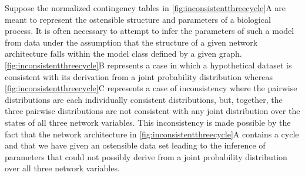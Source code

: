 Suppose the normalized contingency tables in \autoref{fig:inconsistentthreecycle}A are meant to represent the ostensible structure and parameters of a biological process. It is often necessary to attempt to infer the parameters of such a model from data under the assumption that the structure of a given network architecture falls within the model class defined by a given graph. \autoref{fig:inconsistentthreecycle}B represents a case in which a hypothetical dataset is consistent with its derivation from a joint probability distribution whereas \autoref{fig:inconsistentthreecycle}C represents a case of inconsistency where the pairwise distributions are each individually consistent distributions, but, together, the three pairwise distributions are not consistent with any joint distribution over the states of all three network variables.
This inconsistency is made possible by the fact that the network architecture in \autoref{fig:inconsistentthreecycle}A contains a cycle \cite{Lauritzen1996,Geiger2006,Wainwright2007} and that we have given an ostensible data set leading to the inference of parameters that could not possibly derive from a joint probability distribution over all three network variables.

